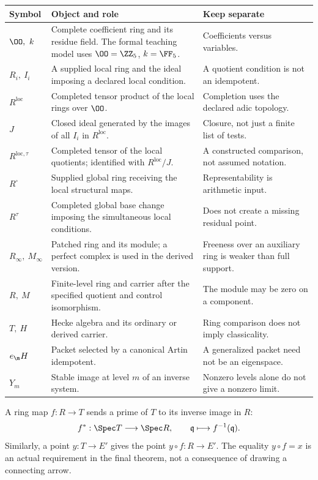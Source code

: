 {\small
\begin{tabularx}{\linewidth}{@{}p{.20\linewidth}Yp{.22\linewidth}@{}}\toprule
\textbf{Symbol} & \textbf{Object and role} & \textbf{Keep separate}\\\midrule
$\OO,\ k$ & Complete coefficient ring and its residue field. The formal teaching model uses $\OO=\ZZ_5$, $k=\FF_5$. & Coefficients versus variables.\\
$R_i,\ I_i$ & A supplied local ring and the ideal imposing a declared local condition. & A quotient condition is not an idempotent.\\
$R^{\mathrm{loc}}$ & Completed tensor product of the local rings over $\OO$. & Completion uses the declared adic topology.\\
$J$ & Closed ideal generated by the images of all $I_i$ in $R^{\mathrm{loc}}$. & Closure, not just a finite list of tests.\\
$R^{\mathrm{loc},\tau}$ & Completed tensor of the local quotients; identified with $R^{\mathrm{loc}}/J$. & A constructed comparison, not assumed notation.\\
$R^\square$ & Supplied global ring receiving the local structural maps. & Representability is arithmetic input.\\
$R^\tau$ & Completed global base change imposing the simultaneous local conditions. & Does not create a missing residual point.\\
$R_\infty,\ M_\infty$ & Patched ring and its module; a perfect complex is used in the derived version. & Freeness over an auxiliary ring is weaker than full support.\\
$R,\ M$ & Finite-level ring and carrier after the specified quotient and control isomorphism. & The module may be zero on a component.\\
$T,\ H$ & Hecke algebra and its ordinary or derived carrier. & Ring comparison does not imply classicality.\\
$e_{\m}H$ & Packet selected by a canonical Artin idempotent. & A generalized packet need not be an eigenspace.\\
$Y_m$ & Stable image at level $m$ of an inverse system. & Nonzero levels alone do not give a nonzero limit.\\\bottomrule
\end{tabularx}}

A ring map $f:R\to T$ sends a prime of $T$ to its inverse image in $R$:
\[
f^*:\Spec T\longrightarrow\Spec R,\qquad \mathfrak q\longmapsto f^{-1}(\mathfrak q).
\]
Similarly, a point $y:T\to E'$ gives the point $y\circ f:R\to E'$. The equality $y\circ f=x$ is an actual requirement in the final theorem, not a consequence of drawing a connecting arrow.

